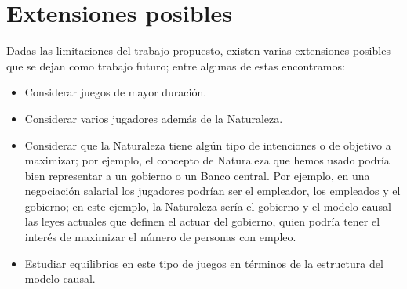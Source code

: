 \documentclass[11pt]{article}
\theoremstyle{plain}
\begin{document}
\section{Extensiones posibles}
Dadas las limitaciones del trabajo propuesto, existen varias extensiones posibles que se dejan como trabajo futuro; entre algunas de estas encontramos:
\begin{itemize}
\item Considerar juegos de mayor duración.
\item Considerar varios jugadores además de la Naturaleza.
\item Considerar que la Naturaleza tiene algún tipo de intenciones o de objetivo a maximizar; por ejemplo, el concepto de Naturaleza que hemos usado podría bien representar a un gobierno o un Banco central. Por ejemplo, en una negociación salarial los jugadores podrían ser el empleador, los empleados y el gobierno; en este ejemplo, la Naturaleza sería el gobierno y el modelo causal las leyes actuales que definen el actuar del gobierno, quien podría tener el interés de maximizar el número de personas con empleo.
\item Estudiar equilibrios en este tipo de juegos en términos de la estructura del modelo causal. 
\end{itemize}
\newpage


\end{document}
